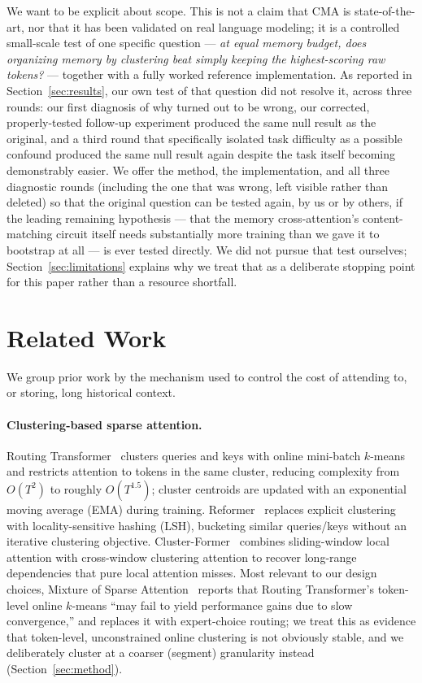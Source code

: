 \documentclass[11pt]{article}
\begin{document}
We want to be explicit about scope. This is not a claim that CMA is state-of-the-art, nor that it
has been validated on real language modeling; it is a controlled small-scale test of one specific
question --- \emph{at equal memory budget, does organizing memory by clustering beat simply
keeping the highest-scoring raw tokens?} --- together with a fully worked reference
implementation. As reported in Section~\ref{sec:results}, our own test of that question did not
resolve it, across three rounds: our first diagnosis of why turned out to be wrong, our corrected,
properly-tested follow-up experiment produced the same null result as the original, and a third
round that specifically isolated task difficulty as a possible confound produced the same null
result again despite the task itself becoming demonstrably easier. We offer the method, the
implementation, and all three diagnostic rounds (including the one that was wrong, left visible
rather than deleted) so that the original question can be tested again, by us or by others, if the
leading remaining hypothesis --- that the memory cross-attention's content-matching circuit itself
needs substantially more training than we gave it to bootstrap at all --- is ever tested directly.
We did not pursue that test ourselves; Section~\ref{sec:limitations} explains why we treat that as
a deliberate stopping point for this paper rather than a resource shortfall.

\section{Related Work}
\label{sec:related}

We group prior work by the mechanism used to control the cost of attending to, or storing,
long historical context.

\paragraph{Clustering-based sparse attention.}
Routing Transformer~\citep{roy2021routing} clusters queries and keys with online mini-batch
$k$-means and restricts attention to tokens in the same cluster, reducing complexity from
$O(T^2)$ to roughly $O(T^{1.5})$; cluster centroids are updated with an exponential moving
average (EMA) during training. Reformer~\citep{kitaev2020reformer} replaces explicit clustering
with locality-sensitive hashing (LSH), bucketing similar queries/keys without an iterative
clustering objective. Cluster-Former~\citep{wang2020clusterformer} combines sliding-window local
attention with cross-window clustering attention to recover long-range dependencies that pure
local attention misses. Most relevant to our design choices, Mixture of Sparse
Attention~\citep{mosa2025} reports that Routing Transformer's token-level online $k$-means
``may fail to yield performance gains due to slow convergence,'' and replaces it with
expert-choice routing; we treat this as evidence that token-level, unconstrained online
clustering is not obviously stable, and we deliberately cluster at a coarser (segment)
granularity instead (Section~\ref{sec:method}).
\end{document}
